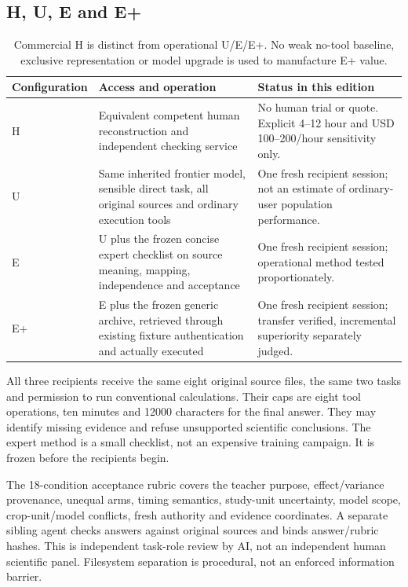 \subsection{H, U, E and E+}

\begin{table}[htbp]
\small
\begin{tabularx}{\textwidth}{lYY}
\toprule
Configuration & Access and operation & Status in this edition\\
\midrule
H & Equivalent competent human reconstruction and independent checking service & No human trial or quote. Explicit 4–12 hour and USD 100–200/hour sensitivity only.\\
U & Same inherited frontier model, sensible direct task, all original sources and ordinary execution tools & One fresh recipient session; not an estimate of ordinary-user population performance.\\
E & U plus the frozen concise expert checklist on source meaning, mapping, independence and acceptance & One fresh recipient session; operational method tested proportionately.\\
E+ & E plus the frozen generic archive, retrieved through existing fixture authentication and actually executed & One fresh recipient session; transfer verified, incremental superiority separately judged.\\
\bottomrule
\end{tabularx}
\caption{Commercial H is distinct from operational U/E/E+. No weak no-tool baseline, exclusive representation or model upgrade is used to manufacture E+ value.}
\end{table}

All three recipients receive the same eight original source files, the same two tasks and permission to run conventional calculations. Their caps are eight tool operations, ten minutes and 12000 characters for the final answer. They may identify missing evidence and refuse unsupported scientific conclusions. The expert method is a small checklist, not an expensive training campaign. It is frozen before the recipients begin.

The 18-condition acceptance rubric covers the teacher purpose, effect/variance provenance, unequal arms, timing semantics, study-unit uncertainty, model scope, crop-unit/model conflicts, fresh authority and evidence coordinates. A separate sibling agent checks answers against original sources and binds answer/rubric hashes. This is independent task-role review by AI, not an independent human scientific panel. Filesystem separation is procedural, not an enforced information barrier.

